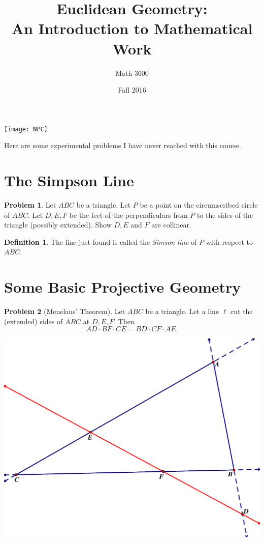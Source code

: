 \documentclass{tufte-handout}
\title{Euclidean Geometry:\\An Introduction to Mathematical Work}
\author[]{Math 3600}
\date{Fall 2016}
\theoremstyle{definition}
\newtheorem{problem}{Problem}[section]
\newtheorem*{definition}{Definition}
\begin{document}
\maketitle

\begin{marginfigure}
    \texttt{[image: NPC]}
\end{marginfigure}

\vspace{.5in}
Here are some experimental problems I have never reached with this course.

\setcounter{section}{19}
\section{The Simpson Line}

\begin{problem}\label{prob:Simson-line}
Let $ABC$ be a triangle. Let $P$ be a point on the circumscribed circle of $ABC$. Let $D, E, F$ be the feet of the perpendiculars from $P$ to the sides of the triangle (possibly extended). Show $D, E$ and $F$ are collinear.
\end{problem}

\begin{definition}\label{defn:Simson-line}
The line just found is called the \emph{Simson line} of $P$ with respect to $ABC$.
\end{definition}


\section{Some Basic Projective Geometry}

\begin{problem}[Menelaus' Theorem]\label{prob:Menelaus-theorem}
Let $ABC$ be a triangle. Let a line $\ell$ cut the (extended) sides of $ABC$ at $D, E, F$. Then
\[ AD\cdot BF \cdot CE = BD \cdot CF \cdot AE .\]
\end{problem}


\begin{center}
\includegraphics[width=.9\textwidth]{Menelaus.pdf}
\end{center}
\end{document}
